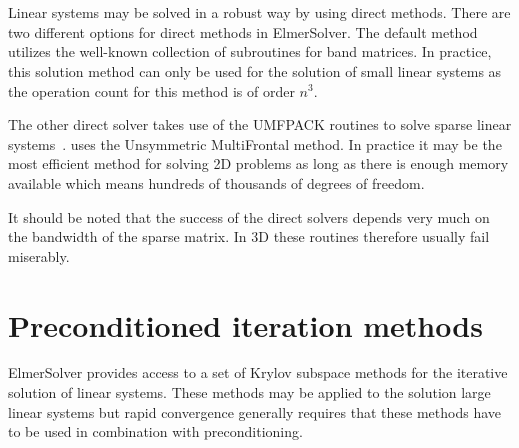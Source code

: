 \begin{versiona}
%
 
 
\section{}

Linear systems may be solved in a robust way by using direct methods. 
There are two different options for direct methods in ElmerSolver. 
The default method utilizes the well-known  collection
of subroutines for band matrices. In practice, 
this solution method can only be used for the solution of small linear systems as 
the operation count for this method is of order $n^3$.

The other direct solver takes use of the UMFPACK
routines to solve sparse linear systems~\cite{umfpack1}.
 uses the Unsymmetric MultiFrontal method.
In practice it may be the most efficient method for solving 
2D problems as long as there is enough memory available
which means hundreds of thousands of degrees of freedom.

It should be noted that the success of the direct solvers 
depends very much on the bandwidth of the sparse matrix. 
In 3D these routines therefore usually fail miserably.


\section{Preconditioned iteration methods}

ElmerSolver provides access to a set of Krylov subspace methods for the 
iterative solution of linear systems. These methods may be applied to the
solution large linear systems but rapid convergence generally requires that 
these methods have to be used in combination with preconditioning.


\end{versiona}
